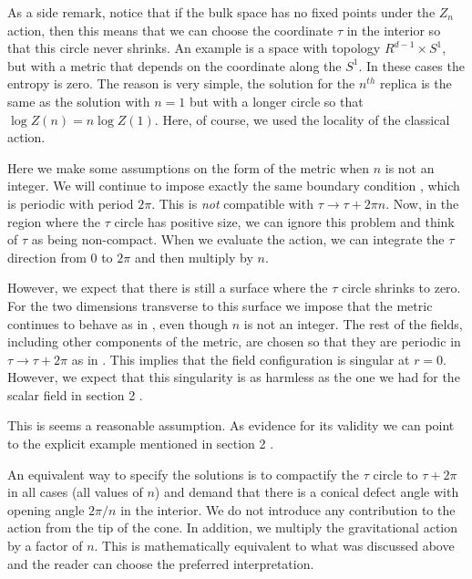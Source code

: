 As a side remark, notice that if the bulk space has no fixed points under the $Z_n$ action, then this means that
we can choose the coordinate $\tau$ in the interior so that this circle never shrinks.
 An example is a space with topology $R^{d-1} \times S^1$,
but with a metric that depends on the coordinate along the $S^1$.
In these cases the entropy is zero.
  The reason is very simple, the solution for the  $n^{th}$ replica is the same as the solution with $n=1$ but
with a longer circle so that $\log Z(n) = n \log Z(1)$. Here, of course, we used the locality of the classical action.



Here we make some assumptions on the form of the metric when $n$ is not an integer.
We will continue to impose exactly the same boundary condition \bcalf , which is periodic with
period $2 \pi $. This is {\it not} compatible with $\tau \to \tau + 2 \pi n$. Now, in the region
where the $\tau $ circle has positive size, we can ignore this problem and think of $\tau$ as being
non-compact. When we evaluate the action, we can integrate  the $\tau $ direction from 0 to $2\pi$ and
then multiply by $n$.

However, we expect that there is still a surface where the $\tau $ circle shrinks to zero. For the two
dimensions transverse to this surface  we
impose that the metric continues to behave as in \metric , even though $n$ is not an integer.
The rest of the fields, including other components of the metric, are chosen so that they are periodic in
$\tau \to \tau + 2 \pi $ as in \perfields.
 This implies that the field configuration is singular at $r=0$. However, we expect that this
singularity is as harmless as the one we had for the scalar field in section 2 .

This is seems a reasonable assumption. As evidence for its validity we can point to the
explicit example mentioned in section 2 .

An  equivalent way to specify the solutions is to compactify the $\tau$ circle to $\tau + 2 \pi $ in all
cases (all values of $n$) and  demand that there is a conical defect angle with opening angle $2\pi/n$ in the interior.
We do not introduce any contribution to the action from the tip of the cone.
In addition,  we   multiply the gravitational action by a factor of $n$.
 This is mathematically equivalent to
what was discussed above and the reader can choose the preferred interpretation.


